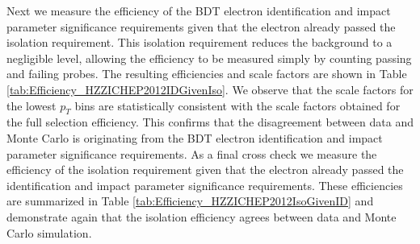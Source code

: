 \documentclass{cmspaper}
\begin{document}
Next we measure the efficiency of the BDT electron identification and impact parameter significance requirements 
given that the electron already passed the isolation requirement. This isolation requirement reduces 
the background to a negligible level, allowing the efficiency
to be measured simply by counting passing and failing probes. The resulting efficiencies and scale factors are shown in
Table \ref{tab:Efficiency_HZZICHEP2012IDGivenIso}. We observe that the scale factors for the lowest $p_{T}$ bins
are statistically consistent with the scale factors obtained for the full selection efficiency. This confirms that the
disagreement between data and Monte Carlo is originating from the BDT electron identification and impact parameter significance 
requirements. As a final cross check we measure the efficiency of the isolation requirement given that the 
electron already passed the identification and impact parameter significance requirements. These efficiencies are summarized in 
Table \ref{tab:Efficiency_HZZICHEP2012IsoGivenID} and demonstrate again that the isolation efficiency agrees between
data and Monte Carlo simulation. 
\end{document}

